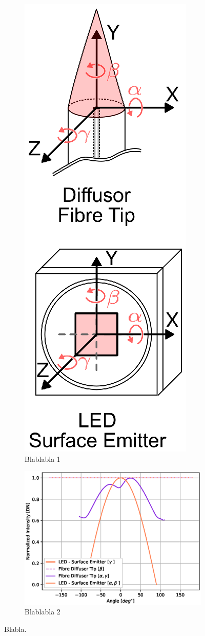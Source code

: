 \documentclass[5p,times,procedia]{elsarticle}
\begin{document}
\begin{figure}
	\centering
	\begin{subfigure}[b]{0.16\textwidth}
		\centering
		\includegraphics[width=0.5\linewidth]{graphics/ActiveMarkerSpatialOrientation.eps}
		\caption{Blablabla 1}
		\label{fig:Ng1} 
	\end{subfigure}
	\begin{subfigure}[b]{0.30\textwidth}
		\centering
		\includegraphics[width=1.0\linewidth]{graphics/ScatteringProfile_DiffuseFibreTip.eps}
		\caption{Blablabla 2}
		\label{fig:Ng2}
	\end{subfigure}
	\caption{Blabla.}
\end{figure}
\end{document}
